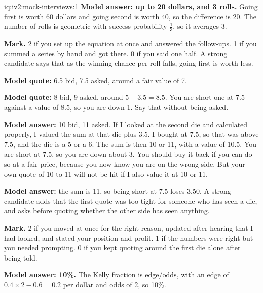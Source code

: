 \begin{solution}{iq:iv2:mock-interviews:1}
\ivstop
\textbf{Model answer: up to 20 dollars, and 3 rolls.} Going first is worth 60 dollars and going second is worth 40, so the difference is 20. The number of rolls is geometric with success probability $\tfrac13$, so it averages 3.

\textbf{Mark.} 2 if you set up the equation at once and answered the follow-ups. 1 if you summed a series by hand and got there. 0 if you said one half. A strong candidate says that as the winning chance per roll falls, going first is worth less.

\ivstop
\textbf{Model quote:} 6.5 bid, 7.5 asked, around a fair value of 7.

\ivstop
\textbf{Model quote:} 8 bid, 9 asked, around $5 + 3.5 = 8.5$. You are short one at 7.5 against a value of 8.5, so you are down 1. Say that without being asked.

\ivstop
\textbf{Model answer:} 10 bid, 11 asked. If I looked at the second die and calculated properly, I valued the sum at that die plus 3.5. I bought at 7.5, so that was above 7.5, and the die is a 5 or a 6. The sum is then 10 or 11, with a value of 10.5. You are short at 7.5, so you are down about 3. You should buy it back if you can do so at a fair price, because you now know you are on the wrong side. But your own quote of 10 to 11 will not be hit if I also value it at 10 or 11.

\ivstop
\textbf{Model answer:} the sum is 11, so being short at 7.5 loses 3.50. A strong candidate adds that the first quote was too tight for someone who has seen a die, and asks before quoting whether the other side has seen anything.

\textbf{Mark.} 2 if you moved at once for the right reason, updated after hearing that I had looked, and stated your position and profit. 1 if the numbers were right but you needed prompting. 0 if you kept quoting around the first die alone after being told.

\ivstop
\textbf{Model answer: 10\%.} The Kelly fraction is $\text{edge}/\text{odds}$, with an edge of $0.4 \times 2 - 0.6 = 0.2$ per dollar and odds of 2, so 10\%.


\end{solution}
